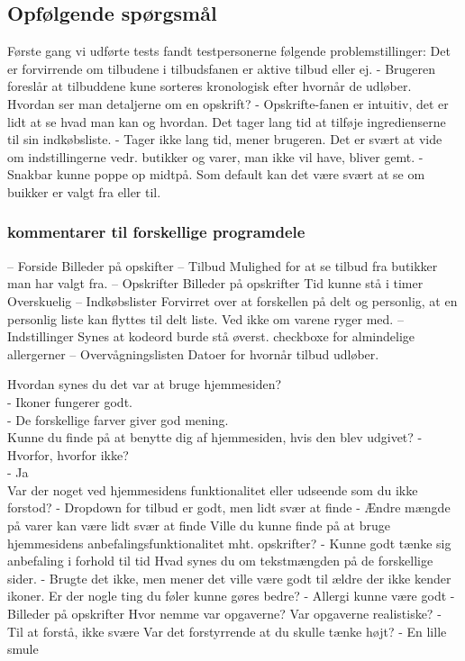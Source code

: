 \subsection{Opfølgende spørgsmål}
Første gang vi udførte tests fandt testpersonerne følgende problemstillinger:
Det er forvirrende om tilbudene i tilbudsfanen er aktive tilbud eller ej.
 - Brugeren foreslår at tilbuddene kune sorteres kronologisk efter hvornår de udløber.
Hvordan ser man detaljerne om en opskrift?
 - Opskrifte-fanen er intuitiv, det er lidt at se hvad man kan og hvordan.
Det tager lang tid at tilføje ingredienserne til sin indkøbsliste.
 - Tager ikke lang tid, mener brugeren.
Det er svært at vide om indstillingerne vedr. butikker og varer, man ikke vil have, bliver gemt.
 - Snakbar kunne poppe op midtpå. Som default kan det være svært at se om buikker er valgt fra eller til.
\subsubsection{kommentarer til forskellige programdele}
– Forside
	Billeder på opskifter
– Tilbud
	Mulighed for at se tilbud fra butikker man har valgt fra.
– Opskrifter
	Billeder på opskrifter
	Tid kunne stå i timer
	Overskuelig
– Indkøbslister
	Forvirret over at forskellen på delt og personlig, at en personlig liste kan flyttes til delt liste. Ved ikke om varene ryger med.
– Indstillinger
Synes at kodeord burde stå øverst.
checkboxe for almindelige allergerner
– Overvågningslisten
	Datoer for hvornår tilbud udløber.

Hvordan synes du det var at bruge hjemmesiden?\\
 - Ikoner fungerer godt. \\
 - De forskellige farver giver god mening.\\
Kunne du finde på at benytte dig af hjemmesiden, hvis den blev udgivet? - Hvorfor, hvorfor ikke?\\
 - Ja\\
Var der noget ved hjemmesidens funktionalitet eller udseende som du ikke forstod?
 - Dropdown for tilbud er godt, men lidt svær at finde
 - Ændre mængde på varer kan være lidt svær at finde
Ville du kunne finde på at bruge hjemmesidens anbefalingsfunktionalitet mht. opskrifter?
 - Kunne godt tænke sig anbefaling i forhold til tid
Hvad synes du om tekstmængden på de forskellige sider.
 - Brugte det ikke, men mener det ville være godt til ældre der ikke kender ikoner.
Er der nogle ting du føler kunne gøres bedre?
 - Allergi kunne være godt
 - Billeder på opskrifter
Hvor nemme var opgaverne? Var opgaverne realistiske?
 - Til at forstå, ikke svære
Var det forstyrrende at du skulle tænke højt?
 - En lille smule



